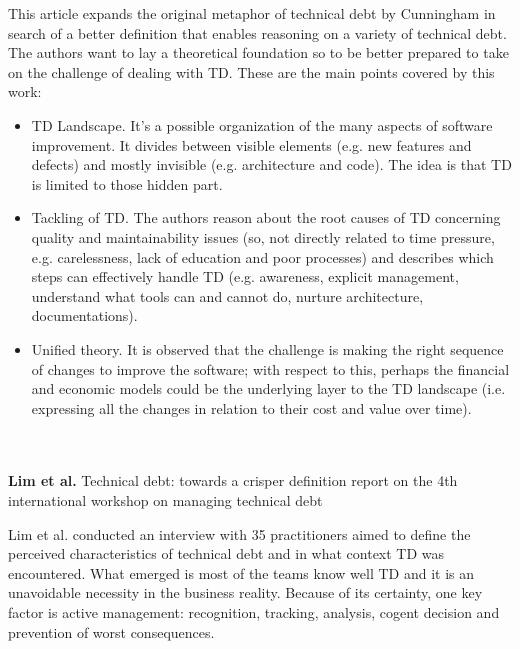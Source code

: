 This article expands the original metaphor of technical debt by Cunningham \cite{cunningham1992wycash} in search of a better definition that enables reasoning on a variety of technical debt.
The authors want to lay a theoretical foundation so to be better prepared to take on the challenge of dealing with TD. These are the main points covered by this work:
\begin{itemize}
    \item TD Landscape. It's a possible organization of the many aspects of software improvement. It divides between visible elements (e.g. new features and defects) and mostly invisible (e.g. architecture and code). The idea is that TD is limited to those hidden part. 
    \item Tackling of TD. The authors reason about the root causes of TD concerning quality and maintainability issues (so, not directly related to time pressure, e.g. carelessness, lack of education and poor processes) and describes which steps can effectively handle TD (e.g. awareness, explicit management, understand what tools can and cannot do, nurture architecture, documentations).
    \item Unified theory. It is observed that the challenge is making the right sequence of changes to improve the software; with respect to this, perhaps the financial and economic models could be the underlying layer to the TD landscape (i.e. expressing all the changes in relation to their cost and value over time).
\end{itemize}
\\
\\
\textbf{Lim et al.} \cite{lim2012balancing} Technical debt: towards a crisper definition report on the 4th international workshop on managing technical debt
 
Lim et al. conducted an interview with 35 practitioners aimed to define the perceived characteristics of technical debt and in what context TD was encountered. What emerged is most of the teams know well TD and it is an unavoidable necessity in the business reality. Because of its certainty, one key factor is active management: recognition, tracking, analysis, cogent decision and prevention of worst consequences.
 
